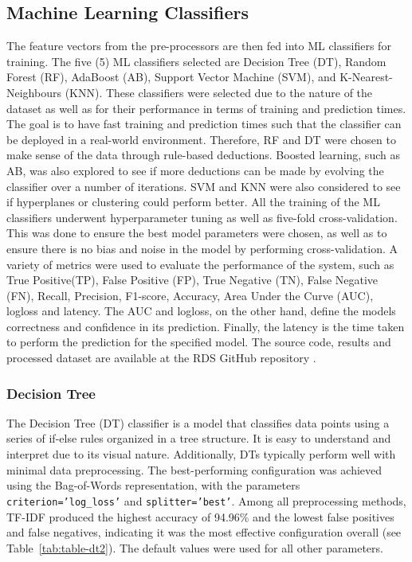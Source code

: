 \documentclass[conference]{IEEEtran}
\begin{document}
\subsection{Machine Learning Classifiers}
The feature vectors from the pre-processors are then fed into ML classifiers for training. The five (5) ML classifiers selected are Decision Tree (DT), Random Forest (RF), AdaBoost (AB), Support Vector Machine (SVM), and K-Nearest-Neighbours (KNN). These classifiers were selected due to the nature of the dataset as well as for their performance in terms of training and prediction times. The goal is to have fast training and prediction times such that the classifier can be deployed in a real-world environment. Therefore, RF and DT were chosen to make sense of the data through rule-based deductions. Boosted learning, such as AB, was also explored to see if more deductions can be made by evolving the classifier over a number of iterations. SVM and KNN were also considered to see if hyperplanes or clustering could perform better. All the training of the ML classifiers underwent hyperparameter tuning as well as five-fold cross-validation. This was done to ensure the best model parameters were chosen, as well as to ensure there is no bias and noise in the model by performing cross-validation. A variety of metrics were used to evaluate the performance of the system, such as True Positive(TP), False Positive (FP), True Negative (TN), False Negative (FN), Recall, Precision, F1-score, Accuracy, Area Under the Curve (AUC), logloss and latency. The AUC and logloss, on the other hand, define the models correctness and confidence in its prediction. Finally, the latency is the time taken to perform the prediction for the specified model. The source code, results and processed dataset are available at the RDS GitHub repository \cite{Daneel2022}.  \\

\subsubsection{Decision Tree}
The Decision Tree (DT) classifier is a model that classifies data points using a series of if-else rules organized in a tree structure. It is easy to understand and interpret due to its visual nature. Additionally, DTs typically perform well with minimal data preprocessing. The best-performing configuration was achieved using the Bag-of-Words representation, with the parameters \texttt{criterion='log\_loss'} and \texttt{splitter='best'}. Among all preprocessing methods, TF-IDF produced the highest accuracy of 94.96\% and the lowest false positives and false negatives, indicating it was the most effective configuration overall (see Table~\ref{tab:table-dt2}). The default values were used for all other parameters.
\end{document}
